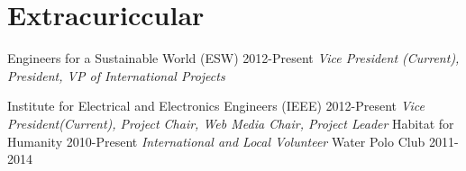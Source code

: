 \documentclass[]{friggeri-cv} %
\begin{document}
\section{Extracuriccular}

\begin{entrylist}
\entryFourItem
{Engineers for a Sustainable World (ESW)}
{2012-Present}
{}
{\emph{Vice President (Current), President, VP of International Projects}}

\entryFourItem
{Institute for Electrical and Electronics Engineers  (IEEE)}
{2012-Present}
{}
{\emph{Vice President(Current), Project Chair, Web Media Chair, Project Leader}}
\entryFourItem
{Habitat for Humanity}
{2010-Present}
{}
{\emph{International and Local Volunteer}}
\entryFourItem
{Water Polo Club}
{2011-2014}
{}
{\emph{}}

\end{entrylist}
\end{document}
